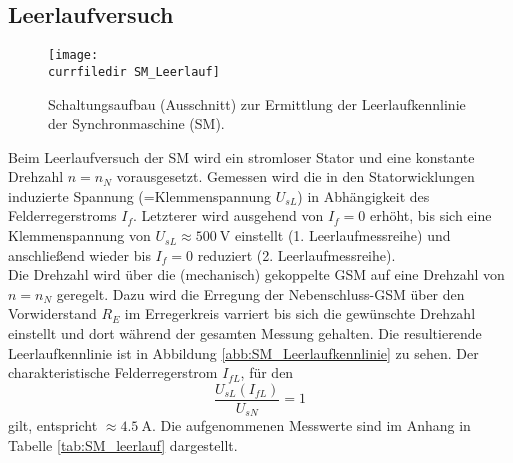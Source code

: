 \subsection{Leerlaufversuch}
\label{subsec:leerlauf}
\begin{figure}
    \centering
    \texttt{[image: \\currfiledir SM\_Leerlauf]}
    \caption{Schaltungsaufbau (Ausschnitt) zur Ermittlung der Leerlaufkennlinie der Synchronmaschine (SM).}
    \label{fig:SM_Leerlauf}
\end{figure}
Beim Leerlaufversuch der SM wird ein stromloser Stator und eine konstante Drehzahl $n=n_N$ vorausgesetzt. Gemessen wird die in den Statorwicklungen induzierte Spannung (=Klemmenspannung $U_{sL}$) in Abhängigkeit des Felderregerstroms $I_f$. Letzterer wird ausgehend von $I_f=0$ erhöht, bis sich eine Klemmenspannung von $U_{sL}\approx\SI{500}{\volt}$ einstellt (1. Leerlaufmessreihe) und anschließend wieder bis $I_f=0$ reduziert (2. Leerlaufmessreihe).\\
Die Drehzahl wird über die (mechanisch) gekoppelte GSM auf eine Drehzahl von $n=n_N$ geregelt. Dazu wird die Erregung der Nebenschluss-GSM über den Vorwiderstand $R_E$ im Erregerkreis varriert bis sich die gewünschte Drehzahl einstellt und dort während der gesamten Messung gehalten. Die resultierende Leerlaufkennlinie ist in Abbildung \ref{abb:SM_Leerlaufkennlinie} zu sehen. Der charakteristische Felderregerstrom $I_{fL}$, für den
\begin{equation*}
    \frac{U_{sL}(I_{fL})}{U_{sN}} = 1 
\end{equation*}
gilt, entspricht $\approx\SI{4.5}{\ampere}$. Die aufgenommenen Messwerte sind im Anhang in Tabelle \ref{tab:SM_leerlauf} dargestellt.


